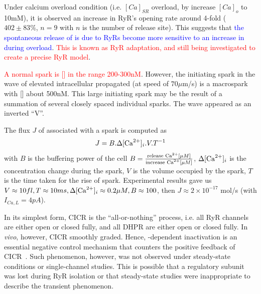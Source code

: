 Under calcium overload condition (i.e. $[Ca]_{SR}$ overload, by
increase $[Ca]_o$ to 10mM), it is observed an increase in RyR's
opening rate around 4-fold ($402\pm 83\%$, $n=9$ with $n$ is the
number of release site). This suggests that
\textcolor{blue}{the spontaneous release of  is due to RyRs
  become more sensitive to an increase in  during 
  overload}.
\textcolor{red}{This is known as RyR adaptation, and still being
  investigated to create a precise RyR model}.

\begin{framed}
  \textcolor{red}{A normal spark is [] in the range
    200-300nM}. However, the initiating spark in the wave of elevated
  intracellular  propagated (at speed of $70\mu$m/s) is a
  macrospark with [] about 500nM. This large initiating
  spark may be the result of a summation of several closely spaced
  individual sparks.  The wave appeared as an inverted
  ``V''\citep{Cheng1993Calciumspark}. 
\end{framed}

The flux $J$ of  associated with a spark is computed as
\begin{equation}
  \label{eq:201}
  J = B.\Delta [\ce{Ca^2+}]_i.V.T^{-1}
\end{equation}
with $B$ is the buffering power of the cell $B=\frac{\text{release
    \ce{Ca^2+}} [\mu M]}{\text{increase  \ce{Ca^2+}} [\mu M]}$,
$\Delta [\ce{Ca^2+}]_i$ is the concentration change during the spark,
$V$ is the volume occupied by the spark, $T$ is the time taken for the
rise of spark. Experimental results gave us $V \approx 10fl, T\approx
10ms, \Delta [\ce{Ca^2+}]_i\approx 0.2\mu M, B \approx 100$, then
$J\approx 2\times 10^{-17}$ mol/s (with $I_{Ca,L}=4pA$).

In its simplest form, CICR is the ``all-or-nothing'' process, i.e. all
RyR channels are either open or closed fully, and all DHPR are either
open or closed fully. In {\it vivo}, however, CICR smoothly
graded. Hence, -dependent inactivation is an essential
negative control mechanism that counters the positive feedback of
CICR~\citep{gyorke1994cdnc}. Such phenomenon, however, was not observed
under steady-state conditions or single-channel studies. This is
possible that a regulatory subunit was lost during RyR isolation or
that steady-state studies were inappropriate to describe the transient
phenomenon.

